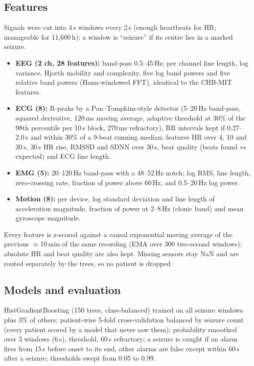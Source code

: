 \subsection{Features}

Signals were cut into 4\,s windows every 2\,s (enough heartbeats for HR; manageable for 11,600\,h); a window is ``seizure'' if its centre lies in a marked seizure.

\begin{itemize}
\item \textbf{EEG (2 ch, 28 features):} band-pass 0.5--45\,Hz; per channel line length, log variance, Hjorth mobility and complexity, five log band powers and five relative band powers (Hann-windowed FFT), identical to the CHB-MIT features.
\item \textbf{ECG (8):} R-peaks by a Pan--Tompkins-style detector (5--20\,Hz band-pass, squared derivative, 120\,ms moving average, adaptive threshold at 30\% of the 98th percentile per 10\,s block, 270\,ms refractory), RR intervals kept if 0.27--2.0\,s and within 30\% of a 9-beat running median; features HR over 4, 10 and 30\,s, 30\,s HR rise, RMSSD and SDNN over 30\,s, beat quality (beats found vs expected) and ECG line length.
\item \textbf{EMG (5):} 20--120\,Hz band-pass with a 48--52\,Hz notch; log RMS, line length, zero-crossing rate, fraction of power above 60\,Hz, and 0.5--20\,Hz log power.
\item \textbf{Motion (8):} per device, log standard deviation and line length of acceleration magnitude, fraction of power at 2--8\,Hz (clonic band) and mean gyroscope magnitude.
\end{itemize}

Every feature is z-scored against a causal exponential moving average of the previous $\approx$10\,min of the same recording (EMA over 300 two-second windows); absolute HR and beat quality are also kept. Missing sensors stay NaN and are routed separately by the trees, so no patient is dropped.

\subsection{Models and evaluation}

HistGradientBoosting (150 trees, class-balanced) trained on all seizure windows plus 3\% of others; patient-wise 5-fold cross-validation balanced by seizure count (every patient scored by a model that never saw them); probability smoothed over 3 windows (6\,s), threshold, 60\,s refractory; a seizure is caught if an alarm fires from 15\,s before onset to its end, other alarms are false except within 60\,s after a seizure; thresholds swept from 0.05 to 0.99.

